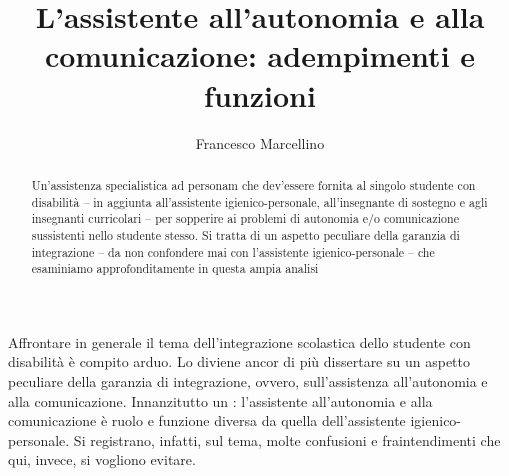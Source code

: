 \begin{abstract}
	Un'assistenza specialistica ad personam che dev'essere fornita al singolo studente con disabilità – in aggiunta all'assistente igienico-personale, all'insegnante di sostegno e agli insegnanti curricolari – per sopperire ai problemi di autonomia e/o comunicazione sussistenti nello studente stesso. Si tratta di un aspetto peculiare della garanzia di integrazione – da non confondere mai con l'assistente igienico-personale – che esaminiamo approfonditamente in questa ampia analisi
\end{abstract}
\author{Francesco Marcellino}
\title{L'assistente all'autonomia e alla comunicazione: adempimenti e funzioni}
\label{cha:marcellino120609}
\maketitle
Affrontare in generale il tema dell'integrazione scolastica dello studente con disabilità è compito arduo. Lo diviene ancor di più dissertare su un aspetto peculiare della garanzia di integrazione, ovvero, sull'assistenza all'autonomia e alla comunicazione.
Innanzitutto un : l'assistente all'autonomia e alla comunicazione è ruolo e funzione diversa da quella dell'assistente igienico-personale. Si registrano, infatti, sul tema, molte confusioni e fraintendimenti che qui, invece, si vogliono evitare.

